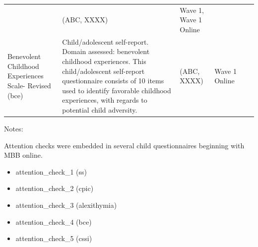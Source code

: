 \documentclass[]{book}
\providecommand{\tightlist}{%
  \setlength{\itemsep}{0pt}\setlength{\parskip}{0pt}}
\begin{document}
\begin{longtable}[]{@{}llllll@{}}
\begin{minipage}[t]{0.18\columnwidth}
\end{minipage} & \begin{minipage}[t]{0.15\columnwidth}\raggedright
(ABC, XXXX)\strut
\end{minipage} & \begin{minipage}[t]{0.16\columnwidth}\raggedright
Wave 1, Wave 1 Online\strut
\end{minipage} & \begin{minipage}[t]{0.06\columnwidth}\raggedright
\strut
\end{minipage} & \begin{minipage}[t]{0.10\columnwidth}\raggedright
\strut
\end{minipage}\tabularnewline
\begin{minipage}[t]{0.18\columnwidth}\raggedright
Benevolent Childhood Experiences Scale- Revised (bce)\strut
\end{minipage} & \begin{minipage}[t]{0.18\columnwidth}\raggedright
Child/adolescent self-report. Domain assessed: benevolent childhood experiences. This child/adolescent self-report questionnaire consists of 10 items used to identify favorable childhood experiences, with regards to potential child adversity.\strut
\end{minipage} & \begin{minipage}[t]{0.15\columnwidth}\raggedright
(ABC, XXXX)\strut
\end{minipage} & \begin{minipage}[t]{0.16\columnwidth}\raggedright
Wave 1 Online\strut
\end{minipage} & \begin{minipage}[t]{0.06\columnwidth}\raggedright
\strut
\end{minipage} & \begin{minipage}[t]{0.10\columnwidth}\raggedright
\strut
\end{minipage}\tabularnewline
\bottomrule
\end{longtable}

Notes:

Attention checks were embedded in several child questionnaires beginning with MBB online.

\begin{itemize}
\tightlist
\item
  attention\_check\_1 (ss)
\item
  attention\_check\_2 (cpic)
\item
  attention\_check\_3 (alexithymia)
\item
  attention\_check\_4 (bce)
\item
  attention\_check\_5 (cssi)
\end{itemize}
\end{document}
